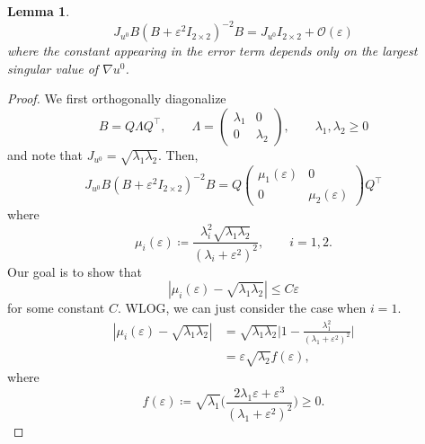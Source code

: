 \documentclass{article}
\theoremstyle{plain}
\newtheorem{lemma}[theorem]{Lemma}
\theoremstyle{definition}
\theoremstyle{remark}
\newcommand{\eps}{\varepsilon}
\begin{document}
\begin{lemma}\label{lem:asymptotic}
    \begin{equation}
        J_{u^0} B (B + \eps^2 I_{2\times 2})^{-2}B = J_{u^0}I_{2\times 2} + \mathcal{O}(\eps)
    \end{equation}
    where the constant appearing in the error term depends only on the largest singular value of $\nabla u^0$.
\end{lemma}

\begin{proof}
    We first orthogonally diagonalize 
    \begin{equation}
        B = Q \Lambda Q^\top, \qquad \Lambda = \begin{pmatrix}
            \lambda_1 & 0 \\ 0 & \lambda_2
        \end{pmatrix},
        \qquad \lambda_1,\lambda_2 \geq 0
    \end{equation}
    and note that $J_{u^0} = \sqrt{\lambda_1 \lambda_2}$. Then,
    \begin{equation}
        J_{u^0} B (B + \eps^2 I_{2\times 2})^{-2}B = Q\begin{pmatrix}
            \mu_1(\eps) & 0 \\ 0 & \mu_2(\eps)
        \end{pmatrix}
        Q^\top
    \end{equation}
    where 
    \begin{equation}
        \mu_i(\eps) \coloneqq \frac{\lambda_i^2 \sqrt{\lambda_1 \lambda_2}}{(\lambda_i + \eps^2)^2}, \qquad i = 1,2.
    \end{equation}
    Our goal is to show that 
    \begin{equation}
        |\mu_i(\eps) - \sqrt{\lambda_1 \lambda_2}| \leq C\eps
    \end{equation}
    for some constant $C$. WLOG, we can just consider the case when $i=1$.
    \begin{equation}
        \begin{split}
            |\mu_i(\eps) - \sqrt{\lambda_1 \lambda_2}| &= \sqrt{\lambda_1 \lambda_2}\bigg|1-\frac{\lambda_1^2}{(\lambda_1 + \eps^2)^2}\bigg|\\
            &= \eps\sqrt{\lambda_2}f(\eps),
        \end{split}
    \end{equation}
    where 
    \begin{equation}
        f(\eps) \coloneqq \sqrt{\lambda_1}\bigg(\frac{2\lambda_1 \eps + \eps^3}{(\lambda_1 + \eps^2)^2}\bigg)\geq 0.

\end{equation}
\end{proof}
\end{document}
